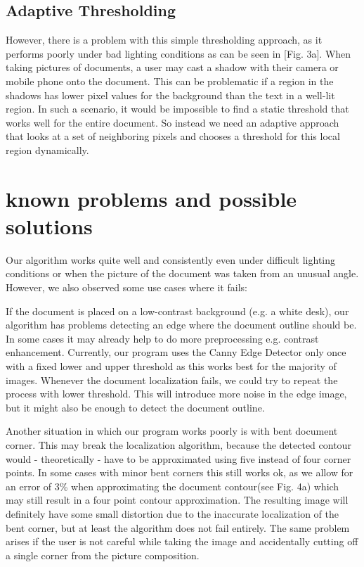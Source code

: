 \documentclass[bibliography=totoc]{scrartcl}
\begin{document}
		\subsection{Adaptive Thresholding}
		However, there is a problem with this simple thresholding approach, as it performs poorly under bad lighting conditions as can be seen in [Fig. 3a].
		When taking pictures of documents, a user may cast a shadow with their camera or mobile phone onto the document. 
		This can be problematic if a region in the shadows has lower pixel values for the background than the text in a well-lit region.
		In such a scenario, it would be impossible to find a static threshold that works well for the entire document.
		So instead we need an adaptive approach that looks at a set of neighboring pixels and chooses a threshold for this local region dynamically.

	\section{known problems and possible solutions}
	Our algorithm works quite well and consistently even under difficult lighting conditions or when the picture of the document was taken from an unusual angle.
	However, we also observed some use cases where it fails:
	
	If the document is placed on a low-contrast background (e.g. a white desk), our algorithm has problems detecting an edge where the document outline should be.
	In some cases it may already help to do more preprocessing e.g. contrast enhancement.
	Currently, our program uses the Canny Edge Detector only once with a fixed lower and upper threshold as this works best for the majority of images.
	Whenever the document localization fails, we could try to repeat the process with lower threshold. 
	This will introduce more noise in the edge image, but it might also be enough to detect the document outline.

	Another situation in which our program works poorly is with bent document corner. 
	This may break the localization algorithm, because the detected contour would - theoretically - have to be approximated using five instead of four corner points.
	In some cases with minor bent corners this still works ok, as we allow for an error of 3\% when approximating the document contour(see Fig. 4a) which may still result in a four point contour approximation. 
	The resulting image will definitely have some small distortion due to the inaccurate localization of the bent corner, but at least the algorithm does not fail entirely.
	The same problem arises if the user is not careful while taking the image and accidentally cutting off a single corner from the picture composition.
	
\end{document}

